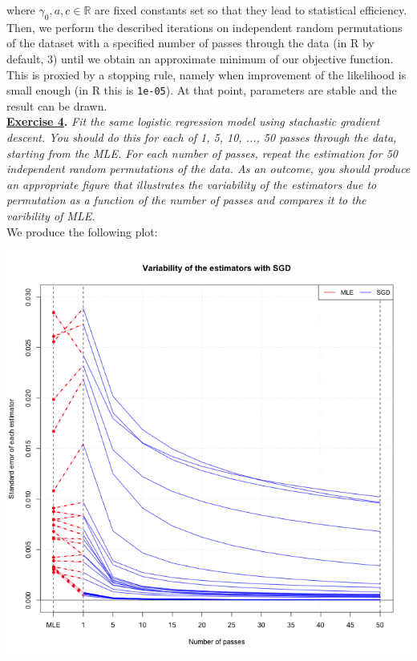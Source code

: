 \documentclass[a4paper, 11pt]{article}
\begin{document}
where $\gamma_0,a,c \in \mathbb{R}$ are fixed constants set so that they lead to statistical efficiency. Then, we perform the described iterations on independent random permutations of the dataset with a specified number of passes through the data (in R by default, 3) until we obtain an approximate minimum of our objective function. This is proxied by a stopping rule, namely when improvement of the likelihood is small enough (in R this is \texttt{1e-05}). At that point, parameters are stable and the result can be drawn.\\
\newpage
\textbf{\underline{Exercise 4}.} \textit{Fit the same logistic regression model using stachastic gradient
descent. You should do this for each of 1, 5, 10, ..., 50 passes through the data, starting from the MLE. For each number of passes, repeat the estimation for 50 independent random permutations of the data. As an outcome, you should produce an appropriate figure that illustrates the variability of the estimators due to permutation as a function of the number of passes and compares it to the varibility of MLE.}\\
\newline We produce the following plot:
\begin{center}
\includegraphics[scale=0.58]{plot_ex4_v3.png}\\
\end{center}
\end{document}
